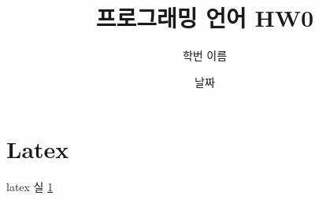 \documentclass{article}
\begin{document}
\title{프로그래밍 언어 HW0}
\author{학번 이름}
\date{날짜}
\maketitle

\section{Latex}
\label{sec:sec1}
latex 실 \ref{sec:sec1} 
\end{document}
